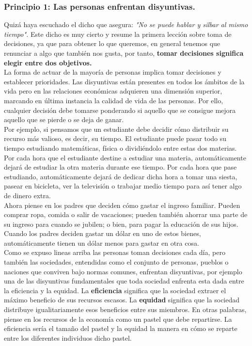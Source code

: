 \subsubsection{Principio 1: Las personas enfrentan disyuntivas.}
Quizá haya escuchado el dicho que asegura: \textit{"No se puede hablar y silbar al mismo tiempo".} Este dicho es muy cierto y resume la primera lección sobre toma de decisiones, \textcolor[rgb]{0,0,0.37}{ya que para obtener lo que queremos, en general tenemos que renunciar a algo que también nos gusta,} por tanto, \textcolor{azul1}{\textbf{tomar decisiones significa elegir entre dos objetivos.}} \\

La forma de actuar de la mayoría de personas implica tomar decisiones y establecer prioridades. Las disyuntivas están presentes en todos los ámbitos de la vida pero en las relaciones económicas adquieren una dimensión superior, marcando en última instancia la calidad de vida de las personas. Por ello, cualquier decisión debe tomarse ponderando si aquello que se consigue mejora aquello que se pierde o se deja de ganar.\\



Por ejemplo, si pensamos que un estudiante debe decidir cómo distribuir su recurso más valioso, es decir, su tiempo. El  estudiante puede pasar todo su tiempo estudiando matemáticas, física o dividiéndolo entre estas dos materias. Por cada hora que el estudiante destine a estudiar una materia, automáticamente dejará de estudiar la otra materia durante ese tiempo. Por cada hora que pase estudiando, automáticamente dejará de dedicar dicha hora a tomar una siesta, pasear en bicicleta, ver la
televisión o trabajar medio tiempo para así tener algo de dinero extra.\\

Ahora piense en los padres que deciden cómo gastar el ingreso familiar. Pueden comprar ropa, comida o salir de vacaciones; pueden también ahorrar una parte de su ingreso para cuando se jubilen; o bien, para pagar la educación de sus hijos. Cuando
los padres deciden gastar un dólar en uno de estos bienes, automáticamente tienen un dólar menos para gastar en otra cosa.\\

Como se expuso lineas arriba las personas toman decisiones cada día, pero también las sociedades, entendidas como el conjunto de personas, pueblos o naciones que conviven bajo normas comunes, enfrentan disyuntivas, por ejemplo una de las disyuntivas fundamentales que toda sociedad enfrenta esta dada entre la eficiencia y la equidad. La \textbf{eficiencia} significa que la sociedad extraer el máximo beneficio de sus recursos escasos. La \textbf{equidad} significa que la sociedad distribuye igualitariamente esos beneficios entre sus miembros. En otras palabras, piense en los recursos de la economía como un pastel que debe repartirse. La eficiencia sería el tamaño del pastel y la equidad la manera en cómo se reparte entre los diferentes individuos dicho pastel.\\





